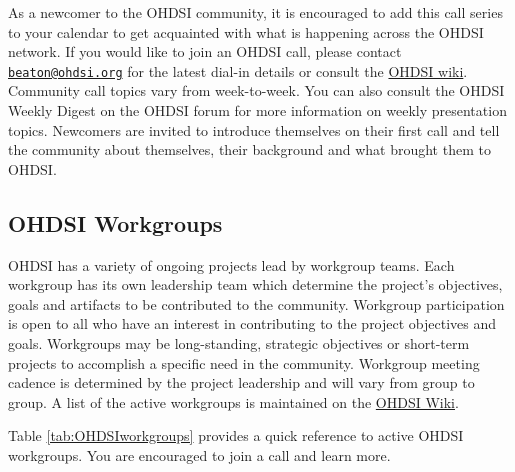 \documentclass[11pt]{book}
\theoremstyle{definition}
\theoremstyle{definition}
\theoremstyle{definition}
\theoremstyle{remark}
\begin{document}
As a newcomer to the OHDSI community, it is encouraged to add this call series to your calendar to get acquainted with what is happening across the OHDSI network. If you would like to join an OHDSI call, please contact \href{mailto:beaton@ohdsi.org}{\nolinkurl{beaton@ohdsi.org}} for the latest dial-in details or consult the \href{https://www.ohdsi.org/web/wiki/doku.php?id=projects:ohdsi_community}{OHDSI wiki}. Community call topics vary from week-to-week. You can also consult the OHDSI Weekly Digest on the OHDSI forum for more information on weekly presentation topics. Newcomers are invited to introduce themselves on their first call and tell the community about themselves, their background and what brought them to OHDSI. 

\hypertarget{ohdsi-workgroups}{%
\subsection{OHDSI Workgroups}\label{ohdsi-workgroups}}

OHDSI has a variety of ongoing projects lead by workgroup teams. Each workgroup has its own leadership team which determine the project's objectives, goals and artifacts to be contributed to the community. Workgroup participation is open to all who have an interest in contributing to the project objectives and goals. Workgroups may be long-standing, strategic objectives or short-term projects to accomplish a specific need in the community. Workgroup meeting cadence is determined by the project leadership and will vary from group to group. A list of the active workgroups is maintained on the \href{https://www.ohdsi.org/web/wiki/doku.php?id=projects:overview}{OHDSI Wiki}. 

Table \ref{tab:OHDSIworkgroups} provides a quick reference to active OHDSI workgroups. You are encouraged to join a call and learn more.
\end{document}
